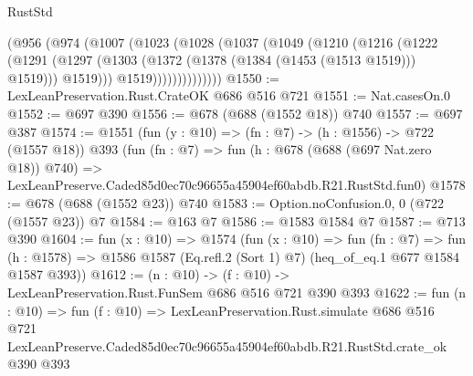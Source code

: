 \begin{lexlean}{RustStd}
\begin{coremodule}
              (@956
                (@974
                  (@1007
                    (@1023
                      (@1028
                        (@1037
                          (@1049
                            (@1210
                              (@1216
                                (@1222
                                  (@1291
                                    (@1297
                                      (@1303 (@1372 (@1378 (@1384 (@1453 (@1513 @1519))) @1519)))
                                      @1519)))
                                @1519))))))))))))))
@1550 := LexLeanPreservation.Rust.CrateOK @686 @516 @721
@1551 := Nat.casesOn.{0}
@1552 := @697 @390
@1556 := @678 (@688 (@1552 @18)) @740
@1557 := @697 @387
@1574 := @1551
    (fun (y : @10) => (fn : @7) -> (h : @1556) -> @722 (@1557 @18))
    @393
    (fun (fn : @7) =>
    fun (h : @678 (@688 (@697 Nat.zero @18)) @740) =>
    LexLeanPreserve.Caded85d0ec70c96655a45904ef60abdb.R21.RustStd.fun0)
@1578 := @678 (@688 (@1552 @23)) @740
@1583 := Option.noConfusion.{0, 0} (@722 (@1557 @23)) @7
@1584 := @163 @7
@1586 := @1583 @1584 @7
@1587 := @713 @390
@1604 := fun (x : @10) =>
  @1574
    (fun (x : @10) =>
    fun (fn : @7) =>
    fun (h : @1578) => @1586 @1587 (Eq.refl.{2} (Sort 1) @7) (heq_of_eq.{1} @677 @1584 @1587 @393))
@1612 := (n : @10) -> (f : @10) -> LexLeanPreservation.Rust.FunSem @686 @516 @721 @390 @393
@1622 := fun (n : @10) =>
  fun (f : @10) =>
  LexLeanPreservation.Rust.simulate
    @686
    @516
    @721
    LexLeanPreserve.Caded85d0ec70c96655a45904ef60abdb.R21.RustStd.crate_ok
    @390
    @393
\end{coremodule}
\end{lexlean}
